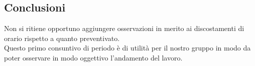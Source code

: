 	\subsection{Conclusioni}
	Non si ritiene opportuno aggiungere osservazioni in merito ai discostamenti di orario rispetto a quanto preventivato.\\
	Questo primo consuntivo di periodo è di utilità per il nostro gruppo in modo da poter osservare in modo oggettivo l'andamento del lavoro.\\
	
